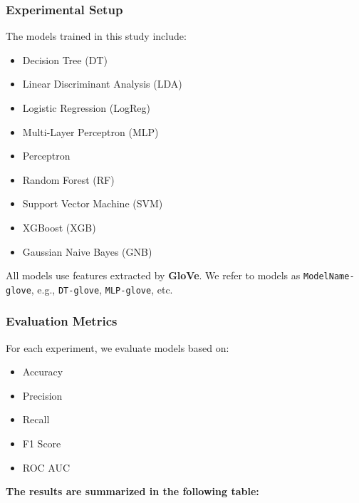 \subsubsection{Experimental Setup}

The models trained in this study include:
\begin{itemize}
    \item Decision Tree (DT)
    \item Linear Discriminant Analysis (LDA)
    \item Logistic Regression (LogReg)
    \item Multi-Layer Perceptron (MLP)
    \item Perceptron
    \item Random Forest (RF)
    \item Support Vector Machine (SVM)
    \item XGBoost (XGB)
    \item Gaussian Naive Bayes (GNB)
\end{itemize}

All models use features extracted by \textbf{GloVe}. We refer to models as \texttt{ModelName-glove}, e.g., \texttt{DT-glove}, \texttt{MLP-glove}, etc.


\subsubsection{Evaluation Metrics}

For each experiment, we evaluate models based on:
\begin{itemize}
    \item Accuracy
    \item Precision
    \item Recall
    \item F1 Score
    \item ROC AUC
\end{itemize}

\textbf{The results are summarized in the following table:}

